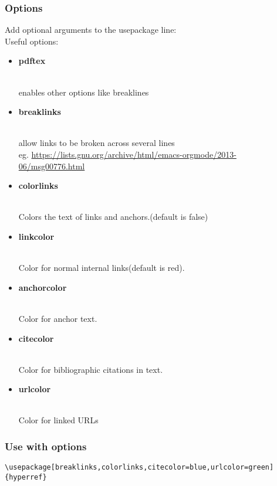 \documentclass{report}
\begin{document}
\subsubsection{\Large Options}
Add optional arguments to the usepackage line:\\
Useful options:\begin{itemize}
\item \begin{large}\textbf{pdftex}\end{large}\\enables other options like breaklines
\item \begin{large}\textbf{breaklinks}\end{large}\\allow links to be broken across several lines\\eg. \url{https://lists.gnu.org/archive/html/emacs-orgmode/2013-06/msg00776.html}
\item \begin{large}\textbf{colorlinks}\end{large}\\Colors the text of links and anchors.(default is false)
\item \begin{large}\textbf{linkcolor}\end{large}\\Color for normal internal links(default is red).
\item \begin{large}\textbf{anchorcolor}\end{large}\\Color for anchor text.
\item \begin{large}\textbf{citecolor}\end{large}\\Color for bibliographic citations in text.
\item \begin{large}\textbf{urlcolor}\end{large}\\Color for linked URLs

\end{itemize}

\subsubsection{\Large Use with options}
\begin{verbatim}
\usepackage[breaklinks,colorlinks,citecolor=blue,urlcolor=green]{hyperref}
\end{verbatim}
\end{document}
